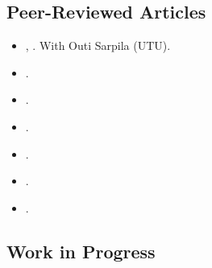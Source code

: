 \subsection*{Peer-Reviewed Articles}


\begin{itemize}

  	\item[\textcolor{gray}{\textbullet}] \href{https://raw.githubusercontent.com/hbahamonde/Physical/main/abstract.txt}{\unskip}, {\bf \emph{\unskip}}. With Outi Sarpila (UTU).


	\item[\textcolor{gray}{\textbullet}] \href{https://doi.org/10.1016/j.electstud.2022.102497}{}.

	\item[\textcolor{gray}{\textbullet}] \href{https://link.springer.com/article/10.1057/s41269-020-00174-4}{}.

	\item[\textcolor{gray}{\textbullet}] \href{https://doi.org/10.1016/j.ejpoleco.2021.102048}{}.

	\item[\textcolor{gray}{\textbullet}] \href{https://doi.org/10.1111/rsp3.12337}{}.

	\item[\textcolor{gray}{\textbullet}] \href{https://doi.org/10.1177/1866802X1801000202}{}.

	\item[\textcolor{gray}{\textbullet}] \href{https://scielo.conicyt.cl/pdf/revcipol/v31n2/art07.pdf}{}.
  
\end{itemize}







\subsection*{Work in Progress}



